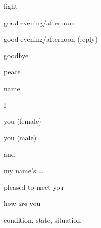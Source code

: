 \documentclass[avery5371,grid,frame]{flashcards}
\begin{document}
\begin{flashcard}{\LARGE light}
\LARGE {}
\end{flashcard}
\begin{flashcard}{\LARGE good evening/afternoon}
\LARGE {}
\end{flashcard}
\begin{flashcard}{\LARGE good evening/afternoon (reply)}
\LARGE {}
\end{flashcard}
\begin{flashcard}{\LARGE goodbye}
\LARGE {}
\end{flashcard}
\begin{flashcard}{\LARGE peace}
\LARGE {}
\end{flashcard}
\begin{flashcard}{\LARGE name}
\LARGE {}
\end{flashcard}
\begin{flashcard}{\LARGE I}
\LARGE {}
\end{flashcard}
\begin{flashcard}{\LARGE you (female)}
\LARGE {}
\end{flashcard}
\begin{flashcard}{\LARGE you (male)}
\LARGE {}
\end{flashcard}
\begin{flashcard}{\LARGE and}
\LARGE {}
\end{flashcard}
\begin{flashcard}{\LARGE my name's ...}
\LARGE {}
\end{flashcard}
\begin{flashcard}{\LARGE pleased to meet you}
\LARGE {}
\end{flashcard}
\begin{flashcard}{\LARGE how are you}
\LARGE {}
\end{flashcard}
\begin{flashcard}{\LARGE condition, state, situation}
\LARGE {}
\end{flashcard}
\end{document}
